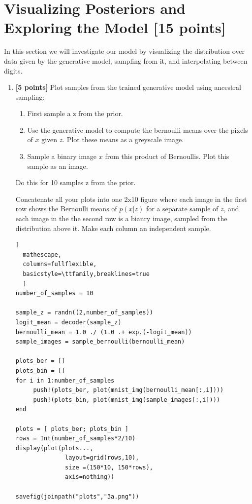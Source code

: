 \documentclass{article}
\begin{document}
\pagebreak

\section{Visualizing Posteriors and Exploring the Model [15 points]}
In this section we will investigate our model by visualizing the distribution over data given by the generative model, sampling from it, and interpolating between digits.

\begin{enumerate}[label=(\alph*)]
	\item {\bf [5 points]} Plot samples from the trained generative model using ancestral sampling:	
	\begin{enumerate}[label=(\alph*)]

			\item First sample a z from the prior.
			\item Use the generative model to compute the bernoulli means over the pixels of $x$ given $z$. Plot these means as a greyscale image.
			\item Sample a binary image $x$ from this product of Bernoullis. Plot this sample as an image.
	\end{enumerate}
	Do this for 10 samples z from the prior.
	
	Concatenate all your plots into one 2x10 figure where each image in the first row shows the Bernoulli means of $p(x|z)$ for a separate sample of $z$, and each image in the the second row is a bianry image, sampled from the distribution above it.
	Make each column an independent sample.

\begin{lstlisting}[
  mathescape,
  columns=fullflexible,
  basicstyle=\ttfamily,breaklines=true
  ]
number_of_samples = 10

sample_z = randn((2,number_of_samples))
logit_mean = decoder(sample_z)
bernoulli_mean = 1.0 ./ (1.0 .+ exp.(-logit_mean))
sample_images = sample_bernoulli(bernoulli_mean)

plots_ber = []
plots_bin = []
for i in 1:number_of_samples
     push!(plots_ber, plot(mnist_img(bernoulli_mean[:,i])))
     push!(plots_bin, plot(mnist_img(sample_images[:,i])))
end

plots = [ plots_ber; plots_bin ]
rows = Int(number_of_samples*2/10)
display(plot(plots...,
              layout=grid(rows,10),
              size =(150*10, 150*rows),
              axis=nothing))

savefig(joinpath("plots","3a.png"))
\end{lstlisting}


\end{enumerate}
\end{document}
